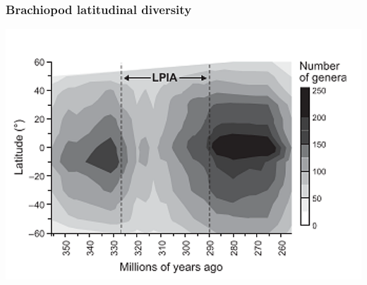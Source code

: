 \documentclass{beamer}
\begin{document}
\begin{frame}
  \frametitle{Brachiopod latitudinal diversity}
  \begin{center}
    \includegraphics[width=\textwidth,height=0.8\textheight,keepaspectratio=true]{figure/powell_2007}
  \end{center}

\end{frame}
\end{document}
